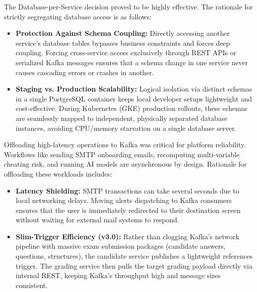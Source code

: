 The Database-per-Service decision proved to be highly effective. The rationale for strictly segregating database access is as follows:
\begin{itemize}
    \item \textbf{Protection Against Schema Coupling:} Directly accessing another service's database tables bypasses business constraints and forces deep coupling. Forcing cross-service access exclusively through REST APIs or serialized Kafka messages ensures that a schema change in one service never causes cascading errors or crashes in another.
    \item \textbf{Staging vs. Production Scalability:} Logical isolation via distinct schemas in a single PostgreSQL container keeps local developer setups lightweight and cost-effective. During Kubernetes (GKE) production rollouts, these schemas are seamlessly mapped to independent, physically separated database instances, avoiding CPU/memory starvation on a single database server.
\end{itemize}

Offloading high-latency operations to Kafka was critical for platform reliability. Workflows like sending SMTP onboarding emails, recomputing multi-variable cheating risk, and running AI models are asynchronous by design. Rationale for offloading these workloads includes:
\begin{itemize}
    \item \textbf{Latency Shielding:} SMTP transactions can take several seconds due to local networking delays. Moving alerts dispatching to Kafka consumers ensures that the user is immediately redirected to their destination screen without waiting for external mail systems to respond.
    \item \textbf{Slim-Trigger Efficiency (v3.0):} Rather than clogging Kafka's network pipeline with massive exam submission packages (candidate answers, questions, structures), the candidate service publishes a lightweight references trigger. The grading service then pulls the target grading payload directly via internal REST, keeping Kafka's throughput high and message sizes consistent.
\end{itemize}

